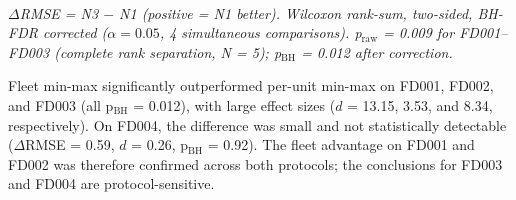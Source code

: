 \documentclass[review,12pt]{elsarticle}
\begin{document}
\begin{table}[!t]
\centering
\footnotesize
\caption{Protocol-unified N1 vs N3 robustness analysis: RMSE (mean$\pm$std, 5 seeds), effect size, and BH-FDR-corrected significance using a backbone-matched unified protocol (LSTM2 hidden = 64, per-seed validation split, op columns removed after residualization).}
\label{tab:va}
\\[3pt]
\begin{minipage}{\linewidth}
\footnotesize\textit{$\Delta$RMSE = N3 $-$ N1 (positive = N1 better). Wilcoxon rank-sum, two-sided, BH-FDR corrected ($\alpha = 0.05$, 4 simultaneous comparisons). p$_\text{raw}$ = 0.009 for FD001--FD003 (complete rank separation, N = 5); p$_\text{BH}$ = 0.012 after correction.}
\end{minipage}
\end{table}

Fleet min-max significantly outperformed per-unit min-max on FD001, FD002, and FD003 (all p$_\text{BH}$ = 0.012), with large effect sizes ($d$ = 13.15, 3.53, and 8.34, respectively). On FD004, the difference was small and not statistically detectable ($\Delta$RMSE = 0.59, $d$ = 0.26, p$_\text{BH}$ = 0.92). The fleet advantage on FD001 and FD002 was therefore confirmed across both protocols; the conclusions for FD003 and FD004 are protocol-sensitive.
\end{document}
